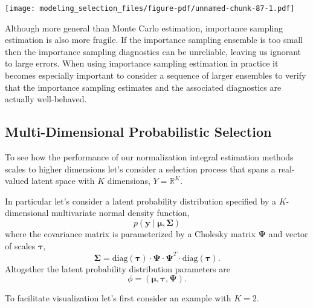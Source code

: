 \documentclass[
  letterpaper,
  DIV=11,
  numbers=noendperiod]{scrartcl}
\begin{document}
\texttt{[image: modeling\_selection\_files/figure-pdf/unnamed-chunk-87-1.pdf]}

Although more general than Monte Carlo estimation, importance sampling
estimation is also more fragile. If the importance sampling ensemble is
too small then the importance sampling diagnostics can be unreliable,
leaving us ignorant to large errors. When using importance sampling
estimation in practice it becomes especially important to consider a
sequence of larger ensembles to verify that the importance sampling
estimates and the associated diagnostics are actually well-behaved.

\subsection{Multi-Dimensional Probabilistic
Selection}\label{multi-dimensional-probabilistic-selection}

To see how the performance of our normalization integral estimation
methods scales to higher dimensions let's consider a selection process
that spans a real-valued latent space with \(K\) dimensions,
\(Y = \mathbb{R}^{K}\).

In particular let's consider a latent probability distribution specified
by a \(K\)-dimensional multivariate normal density function, \[
p( \mathbf{y} \mid \boldsymbol{\mu}, \boldsymbol{\Sigma})
\] where the covariance matrix is parameterized by a Cholesky matrix
\(\boldsymbol{\Psi}\) and vector of scales \(\boldsymbol{\tau}\), \[
\boldsymbol{\Sigma}
=
\mathrm{diag}( \boldsymbol{\tau} ) \cdot
\boldsymbol{\Psi} \cdot \boldsymbol{\Psi}^{T} \cdot
\mathrm{diag}( \boldsymbol{\tau} ).
\] Altogether the latent probability distribution parameters are \[
\phi = (\boldsymbol{\mu}, \boldsymbol{\tau}, \boldsymbol{\Psi}).
\]

To facilitate visualization let's first consider an example with
\(K = 2\).
\end{document}
